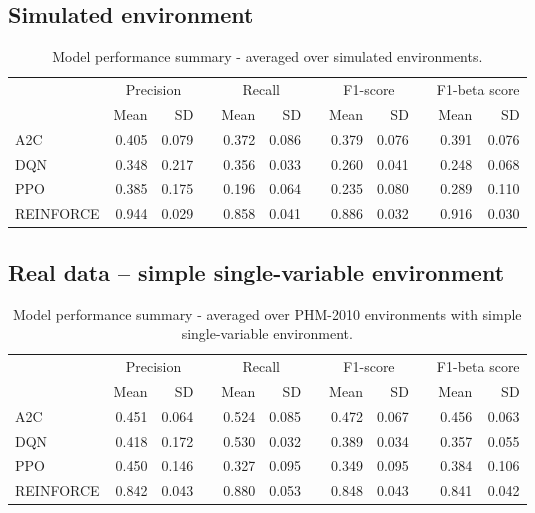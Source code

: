 \documentclass[a4paper, 12pt]{article}
\newcommand{\rowspace}[1]{\renewcommand{\arraystretch}{#1}}
\begin{document}
\subsection{Simulated environment}
\begin{table}[hbt!]\centering\sffamily
	\rowspace{1.3}
	\begin{tabular}{@{}l rr c rr c rr c rr@{}}
		\arrayrulecolor{black!40}\toprule
		& \multicolumn{2}{c}{Precision} & \phantom{i} & \multicolumn{2}{c}{Recall} & \phantom{i} & \multicolumn{2}{c}{F1-score} & \phantom{i} & \multicolumn{2}{c}{F1-beta score} \\
		\cmidrule{2-3} \cmidrule{5-6} \cmidrule{8-9} \cmidrule{11-12} 
		
		&Mean &SD & &Mean &SD & &Mean &SD& &Mean & SD\\ \midrule
		A2C & 0.405 & 0.079 & &0.372 & 0.086 & & 0.379 & 0.076 & &0.391 &0.076 \\
		DQN & 0.348 & 0.217 & &0.356 & 0.033 & & 0.260 & 0.041 & &0.248 &0.068 \\
		PPO & 0.385 & 0.175 & &0.196 & 0.064 & & 0.235 & 0.080 & &0.289 &0.110 \\
		REINFORCE & 0.944 & 0.029 & &0.858 & 0.041 & & 0.886 & 0.032 & &0.916 &0.030 \\
		\bottomrule
	\end{tabular}
	\caption{Model performance summary - averaged over simulated environments.}
	\label{tbl:SimulatedEnv}
\end{table}

\newpage
\subsection{Real data -- simple single-variable environment}
\begin{table}[h]\centering
	\sffamily
	\rowspace{1.3}
	\begin{tabular}{@{}l rr c rr c rr c rr@{}}
		\arrayrulecolor{black!40}\toprule
		& \multicolumn{2}{c}{Precision} & \phantom{i} & \multicolumn{2}{c}{Recall} & \phantom{i} & \multicolumn{2}{c}{F1-score} & \phantom{i} & \multicolumn{2}{c}{F1-beta score} \\
		\cmidrule{2-3} \cmidrule{5-6} \cmidrule{8-9} \cmidrule{11-12} 
		
		&Mean &SD & &Mean &SD & &Mean &SD& &Mean & SD\\ \midrule
		A2C & 0.451 & 0.064 & &0.524 & 0.085 & & 0.472 & 0.067 & &0.456 &0.063 \\
		DQN & 0.418 & 0.172 & &0.530 & 0.032 & & 0.389 & 0.034 & &0.357 &0.055 \\
		PPO & 0.450 & 0.146 & &0.327 & 0.095 & & 0.349 & 0.095 & &0.384 &0.106 \\
		REINFORCE & 0.842 & 0.043 & &0.880 & 0.053 & & 0.848 & 0.043 & &0.841 &0.042 \\
		\bottomrule
	\end{tabular}
	\caption{Model performance summary - averaged over PHM-2010 environments with simple single-variable environment.}
	\label{tbl:PHMSS}
\end{table}
\end{document}
